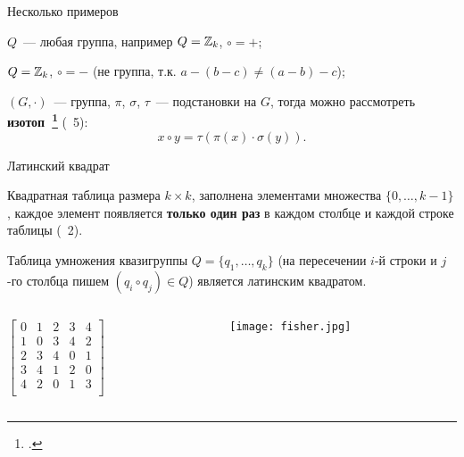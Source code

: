 \begin{frame}{Несколько примеров}
    \begin{coloritemize}
        \item $Q$~--- любая группа, например $Q = \mathbb{Z}_k$, $\circ = +$; 
        \pause 
        \item $Q = \mathbb{Z}_k$, $\circ = -$ (не группа, т.к. $a - (b - c) \ne (a - b) - c$);
        \pause
        \item $(G, \cdot)$~--- группа, $\pi$, $\sigma$, $\tau$~--- подстановки на $G$, тогда можно рассмотреть \textbf{изотоп~\footcite{belousov, keedwell}} (~5):
        \[
            x \circ y = \tau(\pi(x) \cdot \sigma(y)).
        \]
    \end{coloritemize}
\end{frame}


\begin{frame}{Латинский квадрат}
    \begin{coloritemize}
        \item Квадратная таблица размера $k \times k$, заполнена элементами множества $\{ 0, \ldots, k-1 \}$, каждое элемент появляется \textbf{только один раз} в каждом столбце и каждой строке таблицы (~2).
        \item Таблица умножения квазигруппы $Q = \{q_1, \ldots, q_k \}$ (на пересечении $i$-й строки и $j$-го столбца пишем $(q_i \circ q_j) \in Q$) является латинским квадратом.
    \end{coloritemize}

    \begin{columns}[T] %
        \begin{column}{.2\textwidth}
            \(
                \begin{bmatrix}
                    0 & 1 & 2 & 3 & 4 \\
                    1 & 0 & 3 & 4 & 2 \\
                    2 & 3 & 4 & 0 & 1 \\
                    3 & 4 & 1 & 2 & 0 \\
                    4 & 2 & 0 & 1 & 3 \\
                \end{bmatrix}
            \)
        \end{column}%
        \hfill%
        \begin{column}{.4\textwidth}
            \begin{figure}[h]
                \centering 
                \texttt{[image: fisher.jpg]}
            \end{figure}
        \end{column}%
    \end{columns}  
\end{frame}


